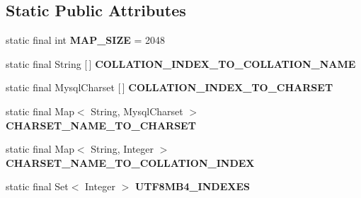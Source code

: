 \subsection*{Static Public Attributes}
\begin{DoxyCompactItemize}
\item 
\mbox{\label{classcom_1_1mysql_1_1jdbc_1_1_charset_mapping_a6f9a1a34f4e29f56e7c54abd951049b6}} 
static final int {\bfseries M\+A\+P\+\_\+\+S\+I\+ZE} = 2048
\item 
\mbox{\label{classcom_1_1mysql_1_1jdbc_1_1_charset_mapping_a8c4b1564e1c9f58e91d7c2de0b7f4b38}} 
static final String \mbox{[}$\,$\mbox{]} {\bfseries C\+O\+L\+L\+A\+T\+I\+O\+N\+\_\+\+I\+N\+D\+E\+X\+\_\+\+T\+O\+\_\+\+C\+O\+L\+L\+A\+T\+I\+O\+N\+\_\+\+N\+A\+ME}
\item 
\mbox{\label{classcom_1_1mysql_1_1jdbc_1_1_charset_mapping_ac2573140fe28de45f22e310adff69b59}} 
static final Mysql\+Charset \mbox{[}$\,$\mbox{]} {\bfseries C\+O\+L\+L\+A\+T\+I\+O\+N\+\_\+\+I\+N\+D\+E\+X\+\_\+\+T\+O\+\_\+\+C\+H\+A\+R\+S\+ET}
\item 
\mbox{\label{classcom_1_1mysql_1_1jdbc_1_1_charset_mapping_a242601dc793fb9f971a4c9f8613bf289}} 
static final Map$<$ String, Mysql\+Charset $>$ {\bfseries C\+H\+A\+R\+S\+E\+T\+\_\+\+N\+A\+M\+E\+\_\+\+T\+O\+\_\+\+C\+H\+A\+R\+S\+ET}
\item 
\mbox{\label{classcom_1_1mysql_1_1jdbc_1_1_charset_mapping_ac1de01c886dfa66ff2362f0803e50401}} 
static final Map$<$ String, Integer $>$ {\bfseries C\+H\+A\+R\+S\+E\+T\+\_\+\+N\+A\+M\+E\+\_\+\+T\+O\+\_\+\+C\+O\+L\+L\+A\+T\+I\+O\+N\+\_\+\+I\+N\+D\+EX}
\item 
\mbox{\label{classcom_1_1mysql_1_1jdbc_1_1_charset_mapping_a4b12700d4bea2c74b979e8f14df32c4c}} 
static final Set$<$ Integer $>$ {\bfseries U\+T\+F8\+M\+B4\+\_\+\+I\+N\+D\+E\+X\+ES}
\item 
\mbox{\label{classcom_1_1mysql_1_1jdbc_1_1_charset_mapping_a03f2034eac682c2c823dff9ee3756689}} 

\end{DoxyCompactItemize}
